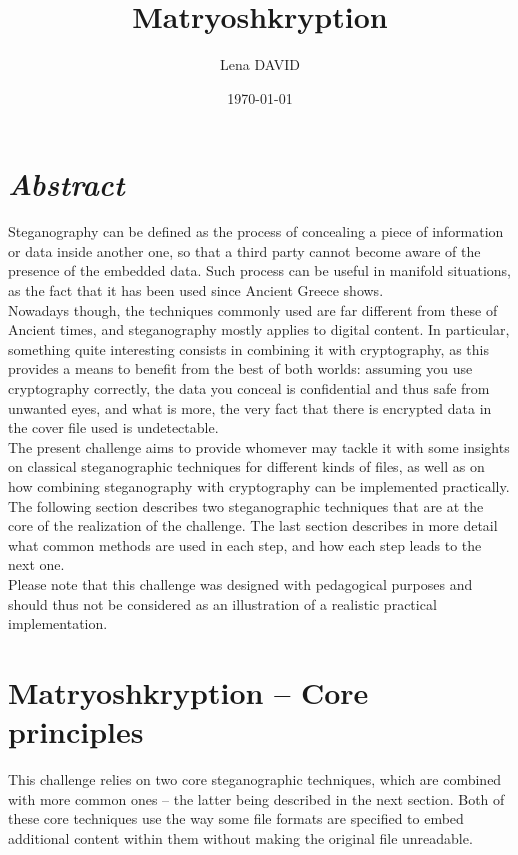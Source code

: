 \documentclass[12pt,a4paper]{article}
\author{Lena DAVID}
\title{Matryoshkryption}
\date{\today}
\begin{document}
\maketitle
\vspace{4em}

\section*{\textit{Abstract}}
    Steganography can be defined as the process of concealing a piece of
    information or data inside another one, so that a third party cannot become
    aware of the presence of the embedded data. Such process can be useful in
    manifold situations, as the fact that it has been used since Ancient Greece
    shows.\\
    \indent Nowadays though, the techniques commonly used are far different from these
    of Ancient times, and steganography mostly applies to digital content. In
    particular, something quite interesting consists in combining it with
    cryptography, as this provides a means to benefit from the best of both
    worlds: assuming you use cryptography correctly, the data you conceal is
    confidential and thus safe from unwanted eyes, and what is more, the very fact
    that there is encrypted data in the cover file used is undetectable.\\
    
    The present challenge aims to provide whomever may tackle it with some
    insights on classical steganographic techniques for different kinds of
    files, as well as on how combining steganography with cryptography can be
    implemented practically.\\
    \indent The following section describes two steganographic techniques that are at
    the core of the realization of the challenge. The last section describes
    in more detail what common methods are used in each step, and how each step
    leads to the next one.\\

    Please note that this challenge was designed with pedagogical purposes and
    should thus not be considered as an illustration of a realistic practical
    implementation.

\section*{Matryoshkryption -- Core principles}
    This challenge relies on two core steganographic techniques, which are
    combined with more common ones -- the latter being described in the next
    section. Both of these core techniques use the way some file formats are
    specified to embed additional content within them without making the
    original file unreadable.\\
\end{document}
